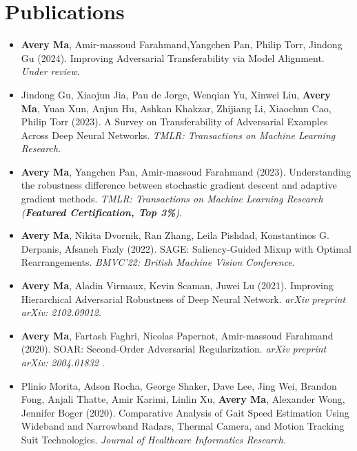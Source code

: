 \section*{Publications}
    \vspace{\postsubhead}
    \begin{adjustwidth}{\indentleft}{\indentright}
        \begin{itemize}
            \setlength\itemsep{0.6em}

            \item \textbf{Avery Ma}, Amir-massoud Farahmand,Yangchen Pan, Philip Torr, Jindong Gu (2024). Improving Adversarial Transferability via Model Alignment. \emph{Under review}.

            \item Jindong Gu, Xiaojun Jia, Pau de Jorge, Wenqian Yu, Xinwei Liu, \textbf{Avery Ma}, Yuan Xun, Anjun Hu, Ashkan Khakzar, Zhijiang Li, Xiaochun Cao, Philip Torr (2023). A Survey on Transferability of Adversarial Examples Across Deep Neural Networks. \emph{TMLR: Transactions on Machine Learning Research}.
            
            \item \textbf{Avery Ma}, Yangchen Pan, Amir-massoud Farahmand (2023). Understanding the robustness difference between stochastic gradient descent and adaptive gradient methods. \emph{TMLR: Transactions on Machine Learning Research (\textbf{Featured Certification, Top 3\%})}.
            
            \item \textbf{Avery Ma}, Nikita Dvornik, Ran Zhang, Leila Pishdad, Konstantinos G. Derpanis, Afsaneh Fazly (2022). SAGE: Saliency-Guided Mixup with Optimal Rearrangements. \emph{BMVC'22: British Machine Vision Conference}.
            
            \item \textbf{Avery Ma}, Aladin Virmaux, Kevin Scaman, Juwei Lu (2021). Improving Hierarchical Adversarial Robustness of Deep Neural Network. \emph{arXiv preprint arXiv: 2102.09012}.
            
            \item \textbf{Avery Ma}, Fartash Faghri, Nicolas Papernot, Amir-massoud Farahmand (2020). SOAR: Second-Order Adversarial Regularization. \emph{arXiv preprint arXiv: 2004.01832} .
            
            \item Plinio Morita, Adson Rocha, George Shaker, Dave Lee, Jing Wei, Brandon Fong, Anjali Thatte, Amir Karimi, Linlin Xu, \textbf{Avery Ma}, Alexander Wong, Jennifer Boger (2020). Comparative Analysis of Gait Speed Estimation Using Wideband and Narrowband Radars, Thermal Camera, and Motion Tracking Suit Technologies. \emph{Journal of Healthcare Informatics Research}.
            

\end{itemize}
\end{adjustwidth}
